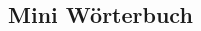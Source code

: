 \documentclass{article}
\begin{document}
\begin{CJK}{UTF8}{min}
  
\section*{Mini Wörterbuch}



\end{CJK}
\end{document}
